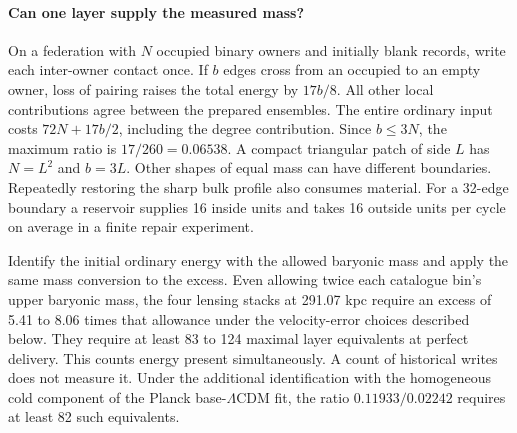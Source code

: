\documentclass[11pt]{article}
\begin{document}
\paragraph{Can one layer supply the measured mass?}
On a federation with $N$ occupied binary owners and initially blank
records, write each inter-owner contact once. If $b$ edges cross from
an occupied to an empty owner, loss of pairing raises the total energy
by $17b/8$. All other local contributions agree between the prepared
ensembles. The entire ordinary input costs $72N+17b/2$, including the
degree contribution. Since $b\leq 3N$, the maximum ratio is
$17/260=0.06538$. A compact triangular patch of side $L$ has $N=L^2$
and $b=3L$. Other shapes of equal mass can have different boundaries.
Repeatedly restoring the sharp bulk profile also consumes material.
For a 32-edge boundary a reservoir supplies 16 inside units and takes
16 outside units per cycle on average in a finite repair experiment.

Identify the initial ordinary energy with the allowed baryonic mass
and apply the same mass conversion to the excess. Even allowing twice
each catalogue bin's upper baryonic mass, the four lensing stacks at
291.07 kpc require an excess of 5.41 to 8.06 times that allowance
under the velocity-error choices described below. They require at
least 83 to 124 maximal layer equivalents at perfect delivery. This
counts energy present simultaneously. A count of historical writes
does not measure it. Under the additional identification with the
homogeneous cold component of the Planck base-$\Lambda$CDM fit, the
ratio $0.11933/0.02242$ requires at least 82 such equivalents.
\end{document}
